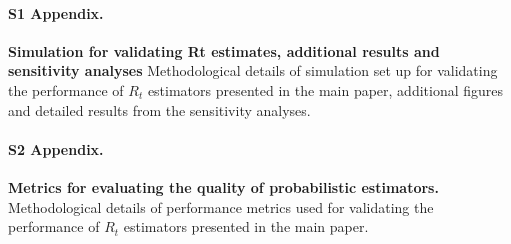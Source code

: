 \documentclass[10pt,letterpaper]{article}
\begin{document}

\paragraph*{S1 Appendix.}
\label{S1_Appendix}
{\bf Simulation for validating Rt estimates, additional results and sensitivity analyses} Methodological details of simulation set up for validating the performance of $R_t$ estimators presented in the main paper, additional figures and detailed results from the sensitivity analyses.

\paragraph*{S2 Appendix.}
\label{S2_Appendix}
{\bf Metrics for evaluating the quality of probabilistic estimators.} Methodological details of performance metrics used for validating the performance of $R_t$ estimators presented in the main paper.
\end{document}

